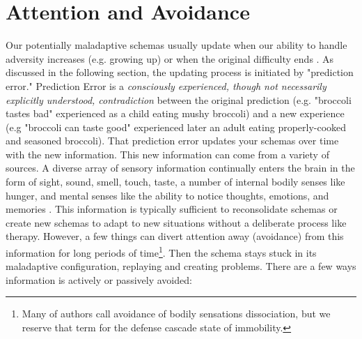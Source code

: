 \documentclass[12pt,letterpaper]{book}
\begin{document}
\section{Attention and Avoidance}
\label{attention}
Our potentially maladaptive schemas usually update when our ability to handle adversity increases (e.g. growing up) or when the original difficulty ends \cite{eckerUnlocking}. As discussed in the following section, the updating process is initiated by "prediction error." Prediction Error is a \textit{consciously experienced, though not necessarily explicitly understood, contradiction} between the original prediction (e.g. "broccoli tastes bad" experienced as a child eating mushy broccoli) and a new experience (e.g "broccoli can taste good" experienced later an adult eating properly-cooked and seasoned broccoli). That prediction error updates your schemas over time with the new information. This new information can come from a variety of sources. A diverse array of sensory information continually enters the brain in the form of sight, sound, smell, touch, taste, a number of internal bodily senses like hunger, and mental senses like the ability to notice thoughts, emotions, and memories \cite{berghSelfEvidencing}. This information is typically sufficient to reconsolidate schemas or create new schemas to adapt to new situations without a deliberate process like therapy. However, a few things can divert attention away (avoidance) from this information for long periods of time\footnote{Many of authors call avoidance of bodily sensations dissociation, but we reserve that term for the defense cascade state of immobility.}. Then the schema stays stuck in its maladaptive configuration, replaying and creating problems. There are a few ways information is actively or passively avoided:
\end{document}
